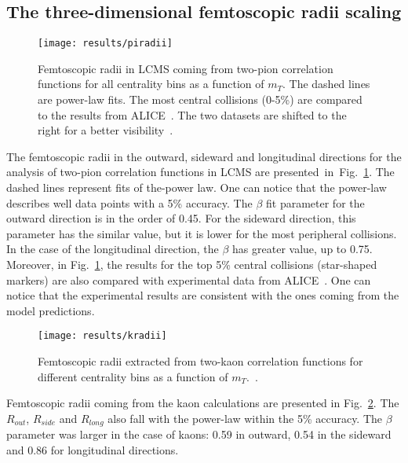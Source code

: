     \subsection{The three-dimensional femtoscopic radii scaling}
      \begin{figure}[b]
        \centering
        \centerline{\texttt{[image: results/piradii]}}
        \caption{Femtoscopic radii in LCMS coming from two-pion correlation functions for all centrality bins as a function of $m_T$. The dashed lines are power-law fits. The most central collisions (0-5\%) are compared to the results from ALICE~\cite{alice_pion}. The two datasets are shifted to the right for a better visibility~\cite{galazyn}.}
        \label{fig:piradii}
      \end{figure}
      The femtoscopic radii in the outward, sideward and longitudinal directions for the analysis of two-pion correlation functions in LCMS are presented~in~Fig.~\ref{fig:piradii}.
      The dashed lines represent fits of the-power law.
      One can notice that the power-law describes well data points with a 5\% accuracy.
      The $\beta$ fit parameter for the outward direction is in the order of 0.45.
      For the sideward direction, this parameter has the similar value, but it is lower for the most peripheral collisions.
      In the case of the longitudinal direction, the $\beta$ has greater value, up to 0.75.
      Moreover, in Fig.~\ref{fig:piradii}, the results for the top 5\% central collisions (star-shaped markers) are also compared with experimental data from ALICE~\cite{alice_pion}.
      One can notice that the experimental results are consistent with the ones coming from the model predictions.
      \begin{figure}[b]
        \centering
        \centerline{\texttt{[image: results/kradii]}}
        \caption{Femtoscopic radii extracted from two-kaon correlation functions for different centrality bins as a function of $m_T$.~\cite{galazyn}.}
      \label{fig:kradii}
      \end{figure}

      Femtoscopic radii coming from the kaon calculations are presented in Fig.~\ref{fig:kradii}.
      The $R_{out}$, $R_{side}$ and $R_{long}$ also fall with the power-law within the 5\% accuracy.
      The $\beta$ parameter was larger in the case of kaons: 0.59 in outward, 0.54 in the sideward and 0.86 for longitudinal directions.

